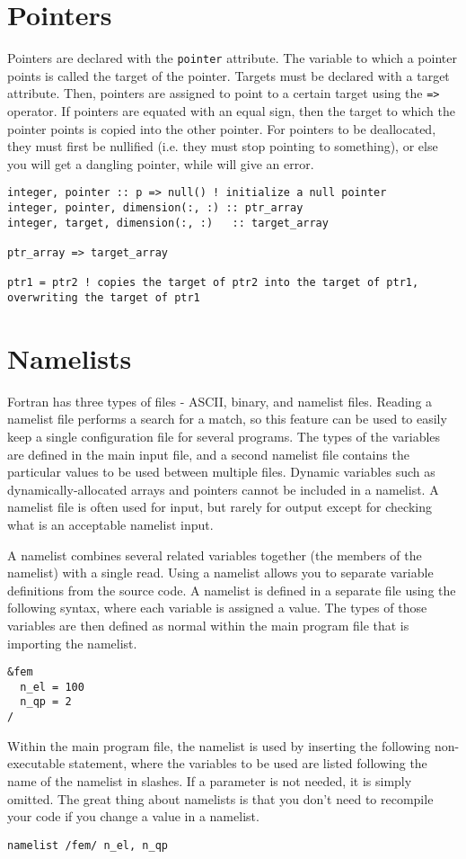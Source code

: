 \documentclass[10pt]{article}
\begin{document}
\section{Pointers}
Pointers are declared with the {\tt pointer} attribute. The variable to which a pointer points is called the target of the pointer. Targets must be declared with a target attribute. Then, pointers are assigned to point to a certain target using the {\tt =>} operator. If pointers are equated with an equal sign, then the target to which the pointer points is copied into the other pointer. For pointers to be deallocated, they must first be nullified (i.e. they must stop pointing to something), or else you will get a dangling pointer, while will give an error.

\begin{lstlisting}
integer, pointer :: p => null() ! initialize a null pointer
integer, pointer, dimension(:, :) :: ptr_array
integer, target, dimension(:, :)   :: target_array

ptr_array => target_array

ptr1 = ptr2 ! copies the target of ptr2 into the target of ptr1, overwriting the target of ptr1
\end{lstlisting}

\section{Namelists}
Fortran has three types of files - ASCII, binary, and namelist files. Reading a namelist file performs a search for a match, so this feature can be used to easily keep a single configuration file for several programs. The types of the variables are defined in the main input file, and a second namelist file contains the particular values to be used between multiple files. Dynamic variables such as dynamically-allocated arrays and pointers cannot be included in a namelist. A namelist file is often used for input, but rarely for output except for checking what is an acceptable namelist input. 

A namelist combines several related variables together (the members of the namelist) with a single read. Using a namelist allows you to separate variable definitions from the source code. A namelist is defined in a separate file using the following syntax, where each variable is assigned a value. The types of those variables are then defined as normal within the main program file that is importing the namelist.

\begin{lstlisting}
&fem
  n_el = 100
  n_qp = 2
/
\end{lstlisting}

Within the main program file, the namelist is used by inserting the following non-executable statement, where the variables to be used are listed following the name of the namelist in slashes. If a parameter is not needed, it is simply omitted. The great thing about namelists is that you don't need to recompile your code if you change a value in a namelist. 

\begin{lstlisting}
namelist /fem/ n_el, n_qp
\end{lstlisting}
\end{document}
